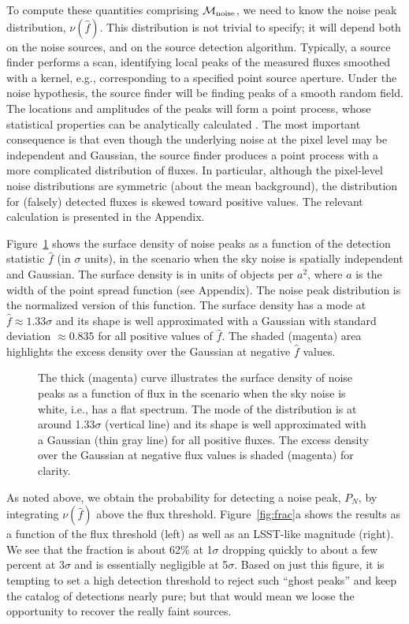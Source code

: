 \documentclass[twocolumn]{emulateapj}
\newcommand{\mlike}{\mathcal{M}}  %
\newcommand{\flux}{f}
\newcommand{\fest}{\hat{\flux}}  %
\newcommand{\npd}{\nu}  %
\begin{document}
To compute these quantities comprising $\mlike_{\rm noise}$, we need to know the noise peak distribution, $\npd(\fest)$.
This distribution is not trivial to specify; it will depend both on the noise sources, and on the source detection algorithm.
%
Typically, a source finder performs a scan, identifying local peaks of the measured fluxes smoothed with a kernel, e.g., corresponding to a specified point source aperture.
Under the noise hypothesis, the source finder will be finding peaks of a smooth random field.
The locations and amplitudes of the peaks will form a point process, whose statistical properties can be analytically calculated \citep{adler,bbks,bond,kaiser}.
%
The most important consequence is that even though the underlying noise at the pixel level may be independent and Gaussian, the source finder produces a point process with a more complicated distribution of fluxes.
In particular, although the pixel-level noise distributions are symmetric (about the mean background), the distribution for (falsely) detected fluxes is skewed toward positive values.
%
The relevant calculation is presented in the Appendix.

Figure~\ref{fig:surface} shows the surface density of noise peaks as a function of the detection statistic $\fest$ (in $\sigma$ units), in the scenario when the sky noise is spatially independent and Gaussian.
The surface density is in units of objects per $a^2$, where $a$ is the width of the point spread function (see Appendix).
The noise peak distribution is the normalized version of this function.
The surface density has a mode at $\fest \approx 1.33\sigma$ and its shape is well approximated with a Gaussian with standard deviation $\approx 0.835$ for all positive values of $\fest$. 
The shaded (magenta) area highlights the excess density over the Gaussian at negative $\fest$ values.

\begin{figure}
\caption{The thick (magenta) curve illustrates the surface density of noise peaks as a function of flux in the scenario when the sky noise is white, i.e., has a flat spectrum. The mode of the distribution is at around 1.33$\sigma$ (vertical line) and its shape is well approximated with a Gaussian (thin gray line) for all positive fluxes. The excess density over the Gaussian at negative flux values is shaded (magenta) for clarity.}
\label{fig:surface}
\end{figure}

As noted above, we obtain the probability for detecting a noise peak, $P_N$, by integrating $\npd(\fest)$ above the flux threshold.
%
Figure~\ref{fig:frac}a shows the results as a function of the flux threshold (left) as well as an LSST-like magnitude (right). We see that the fraction is about 62\% at 1$\sigma$ dropping quickly to about a few percent at 3$\sigma$ and is essentially negligible at 5$\sigma$.
%
Based on just this figure, it is tempting to set a high detection threshold to reject such ``ghost peaks'' and keep the catalog of detections nearly pure; but that would mean we loose the opportunity to recover the really faint sources. 
\end{document}
